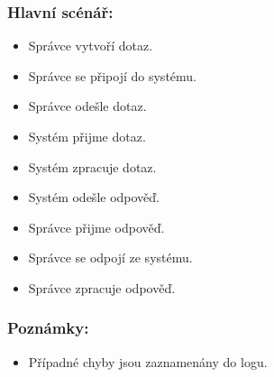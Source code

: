 \subsubsection*{Hlavní scénář:}
\begin{itemize}
 \item Správce vytvoří dotaz.
 \item Správce se připojí do systému.
 \item Správce odešle dotaz.
 \item Systém přijme dotaz.
 \item Systém zpracuje dotaz.
 \item Systém odešle odpověď.
 \item Správce přijme odpověď.
 \item Správce se odpojí ze systému.
 \item Správce zpracuje odpověď.
\end{itemize}
\subsubsection*{Poznámky:}
\begin{itemize}
 \item Případné chyby jsou zaznamenány do logu.
\end{itemize}


